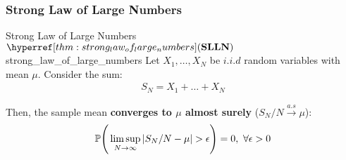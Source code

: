 \subsubsection{Strong Law of Large Numbers}
\begin{theorem}{Strong Law of Large Numbers $\SLLN$}{strong_law_of_large_numbers}
    Let $X_1, \dots, X_N$ be $i.i.d$ random variables with mean $\mu$. Consider the sum:
    \begin{align*}
        S_N = X_1 + \dots + X_N
    \end{align*}

    \noindent Then, the sample mean \textbf{converges to $\mu$ almost surely} ($S_N/N\xrightarrow{a.s}\mu$):
    \begin{align}
        \mathbb{P}\Bigg( 
            \limsup_{N\to\infty}|S_N/N - \mu| > \epsilon
         \Bigg) = 0, \ \forall \epsilon > 0
    \end{align}
\end{theorem}

